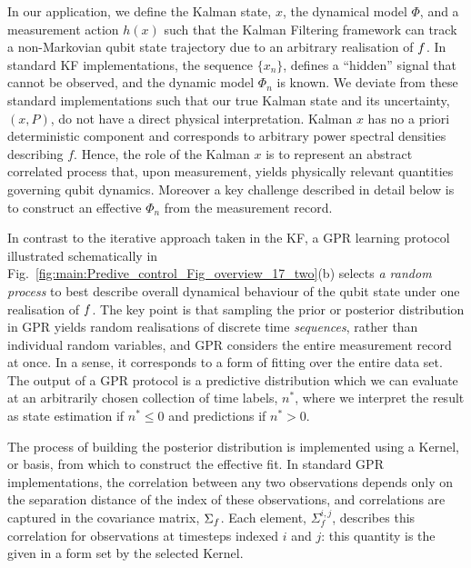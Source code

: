\documentclass[pra, reprint]{revtex4-1}
\begin{document}
 In our application, we define the Kalman state, $x$, the dynamical model $\Phi$, and a measurement action $h(x)$ such that the Kalman Filtering framework can track a non-Markovian qubit state trajectory due to an arbitrary realisation of $f$. In standard KF implementations, the sequence $\{x_n\}$, defines a ``hidden'' signal that cannot be observed, and the dynamic model $\Phi_n$ is known.  We deviate from these standard implementations such that our true Kalman state and its uncertainty, $(x, P)$, do not have a direct physical interpretation.  Kalman $x$ has no a priori deterministic component and corresponds to arbitrary power spectral densities describing $f$. Hence, the role of the Kalman $x$ is to represent an abstract correlated process that, upon measurement, yields physically relevant quantities governing qubit dynamics.  Moreover a key challenge described in detail below is to construct an effective $\Phi_{n}$ from the measurement record.   

In contrast to the iterative approach taken in the KF, a GPR learning protocol illustrated schematically in Fig.~\ref{fig:main:Predive_control_Fig_overview_17_two}(b) selects \textit{a random process} to best describe overall dynamical behaviour of the qubit state under one realisation of $f$. The key point is that sampling the prior or posterior distribution in GPR yields random realisations of discrete time \textit{sequences}, rather than individual random variables, and GPR considers the entire measurement record at once.  In a sense, it corresponds to a form of fitting over the entire data set.  The output of a GPR protocol is a predictive distribution which we can evaluate at an arbitrarily chosen collection of time labels, $n^*$, where we interpret the result as state estimation if $n^* \leq 0$ and predictions if $n^*>0$. 

The process of building the posterior distribution is implemented using a Kernel, or basis, from which to construct the effective fit.  In standard GPR implementations, the correlation between any two observations depends only on the separation distance of the index of these observations, and correlations are captured in the covariance matrix, $\Sigma_f$. Each element, $\Sigma_f^{i, j}$, describes this correlation for observations at timesteps indexed $i$ and $j$: this quantity is the given in a form set by the selected Kernel. 
\end{document}
